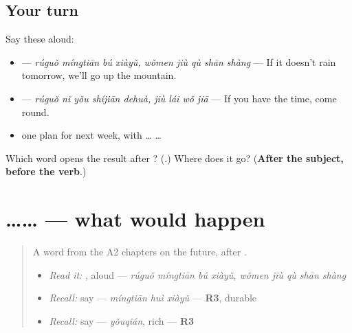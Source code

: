 \subsection*{Your turn}
Say these aloud:

\begin{itemize}
\raggedright
  \item {}  — \emph{rúguǒ míngtiān bú xiàyǔ, wǒmen jiù qù shān shàng} — If it doesn't rain tomorrow, we'll go up the mountain.
  \item {}  — \emph{rúguǒ nǐ yǒu shíjiān dehuà, jiù lái wǒ jiā} — If you have the time, come round.
  \item one plan for next week, with  …  …
\end{itemize}

\begin{tcolorbox}[breakable,colback=teal!4,colframe=teal!35!black,title={Before you move on}]
Which word opens the result after ? (\textbf{}.) Where does it go? (\textbf{After the subject, before the verb}.)
\end{tcolorbox}
\section[\texorpdfstring{\zh{如果}…\zh{就会}… (rúguǒ … jiù huì …)}{如果…就会… (rúguǒ … jiù huì …)}]{…… — what would happen}

\label{lesson:ZH-C289-would}



\begin{quote}
A word from the A2 chapters on the future, after .

\begin{itemize}
\raggedright
  \item \emph{Read it:}  , aloud — \emph{rúguǒ míngtiān bú xiàyǔ, wǒmen jiù qù shān shàng}
  \item \emph{Recall:} say  — \emph{míngtiān huì xiàyǔ} — \textbf{R3}, durable
  \item \emph{Recall:} say  — \emph{yǒuqián}, rich — \textbf{R3}
\end{itemize}
\end{quote}

